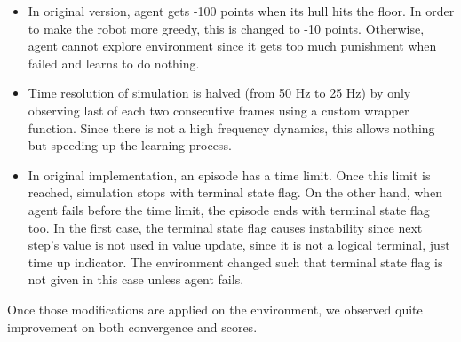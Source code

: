 \begin{itemize}
	\item In original version, agent gets -100 points when its hull hits the floor. 
	In order to make the robot more greedy, this is changed to -10 points. 
	Otherwise, agent cannot explore environment since it gets too much punishment when failed and learns to do nothing.
	\item Time resolution of simulation is halved (from 50 Hz to 25 Hz) by only observing last of each two consecutive frames using a custom wrapper function. 
	Since there is not a high frequency dynamics, this allows nothing but speeding up the learning process.
	\item In original implementation, an episode has a time limit. 
	Once this limit is reached, simulation stops with terminal state flag. 
	On the other hand, when agent fails before the time limit, the episode ends with terminal state flag too. 
	In the first case, the terminal state flag causes instability since next step's value is not used in value update, since it is not a logical terminal, just time up indicator.
	The environment changed such that terminal state flag is not given in this case unless agent fails. 
\end{itemize}

Once those modifications are applied on the environment, we observed quite improvement on both convergence and scores. 
